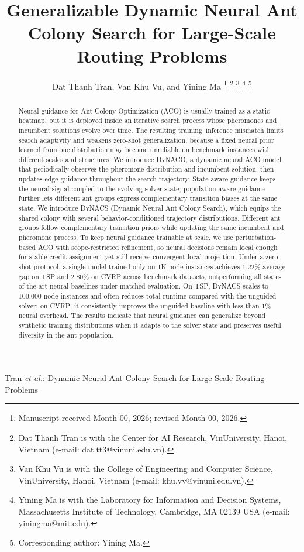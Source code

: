 \documentclass[journal]{IEEEtai}
\newcommand{\TSP}{\textsc{TSP}}
\newcommand{\CVRP}{\textsc{CVRP}}
\newcommand{\DyNACO}{\textsc{DyNACO}}
\newcommand{\DyNACS}{\textsc{DyNACS}}
\begin{document}
\title{Generalizable Dynamic Neural Ant Colony Search for Large-Scale Routing Problems}

\author{Dat Thanh Tran, Van Khu Vu, and Yining Ma
\thanks{Manuscript received Month 00, 2026; revised Month 00, 2026.}
\thanks{Dat Thanh Tran is with the Center for AI Research, VinUniversity, Hanoi, Vietnam (e-mail: dat.tt3@vinuni.edu.vn).}
\thanks{Van Khu Vu is with the College of Engineering and Computer Science, VinUniversity, Hanoi, Vietnam (e-mail: khu.vv@vinuni.edu.vn).}
\thanks{Yining Ma is with the Laboratory for Information and Decision Systems, Massachusetts Institute of Technology, Cambridge, MA 02139 USA (e-mail: yiningma@mit.edu).}
\thanks{Corresponding author: Yining Ma.}}

%
{Tran \MakeLowercase{\textit{et al.}}: Dynamic Neural Ant Colony Search for Large-Scale Routing Problems}

\maketitle

\begin{abstract}
Neural guidance for Ant Colony Optimization (ACO) is usually trained as a static heatmap, but it is deployed inside an iterative search process whose pheromones and incumbent solutions evolve over time. The resulting training--inference mismatch limits search adaptivity and weakens zero-shot generalization, because a fixed neural prior learned from one distribution may become unreliable on benchmark instances with different scales and structures. We introduce \DyNACO{}, a dynamic neural ACO model that periodically observes the pheromone distribution and incumbent solution, then updates edge guidance throughout the search trajectory. State-aware guidance keeps the neural signal coupled to the evolving solver state; population-aware guidance further lets different ant groups express complementary transition biases at the same state. We introduce \DyNACS{} (Dynamic Neural Ant Colony Search), which equips the shared colony with several behavior-conditioned trajectory distributions. Different ant groups follow complementary transition priors while updating the same incumbent and pheromone process. To keep neural guidance trainable at scale, we use perturbation-based ACO with scope-restricted refinement, so neural decisions remain local enough for stable credit assignment yet still receive convergent local projection. Under a zero-shot protocol, a single model trained only on 1K-node instances achieves $1.22\%$ average gap on \TSP{} and $2.80\%$ on \CVRP{} across benchmark datasets, outperforming all state-of-the-art neural baselines under matched evaluation. On \TSP{}, \DyNACS{} scales to 100,000-node instances and often reduces total runtime compared with the unguided solver; on \CVRP{}, it consistently improves the unguided baseline with less than $1\%$ neural overhead. The results indicate that neural guidance can generalize beyond synthetic training distributions when it adapts to the solver state and preserves useful diversity in the ant population.
\end{abstract}
\end{document}
